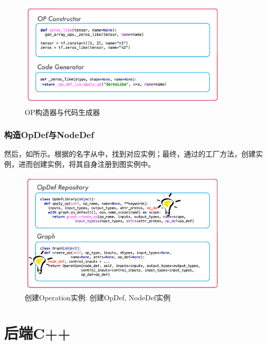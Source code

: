 \begin{content}
\begin{figure}[!htbp]
\centering
\includegraphics[width=0.9\textwidth]{figures/py-op-constructor.png}
\caption{OP构造器与代码生成器}
 \label{fig:py-op-constructor}
\end{figure}

\subsubsection{构造OpDef与NodeDef}

然后，如所示。根据的名字从中，找到对应实例；最终，通过的工厂方法，创建实例，进而创建实例，将其自身注册到图实例中。

\begin{figure}[!htbp]
\centering
\includegraphics[width=0.9\textwidth]{figures/py-graph-create-op.png}
\caption{创建Operation实例: 创建OpDef, NodeDef实例}
 \label{fig:py-graph-create-op}
\end{figure}

\end{content}

\section{后端C++}

